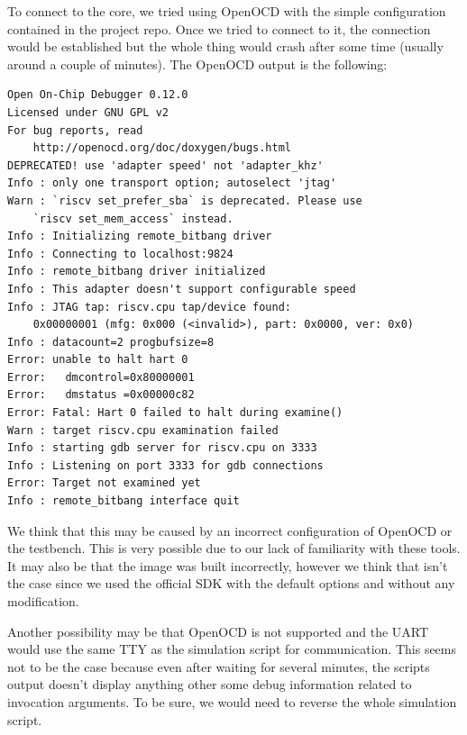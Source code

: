 \documentclass[a4paper,11pt]{article}
\begin{document}
To connect to the core, we tried using OpenOCD with the simple configuration
contained in the project repo. Once we tried to connect to it, the connection
would be established but the whole thing would crash after some time (usually
around a couple of minutes). The OpenOCD output is the following:

\begin{verbatim}
Open On-Chip Debugger 0.12.0
Licensed under GNU GPL v2
For bug reports, read
    http://openocd.org/doc/doxygen/bugs.html
DEPRECATED! use 'adapter speed' not 'adapter_khz'
Info : only one transport option; autoselect 'jtag'
Warn : `riscv set_prefer_sba` is deprecated. Please use
    `riscv set_mem_access` instead.
Info : Initializing remote_bitbang driver
Info : Connecting to localhost:9824
Info : remote_bitbang driver initialized
Info : This adapter doesn't support configurable speed
Info : JTAG tap: riscv.cpu tap/device found:
    0x00000001 (mfg: 0x000 (<invalid>), part: 0x0000, ver: 0x0)
Info : datacount=2 progbufsize=8
Error: unable to halt hart 0
Error:   dmcontrol=0x80000001
Error:   dmstatus =0x00000c82
Error: Fatal: Hart 0 failed to halt during examine()
Warn : target riscv.cpu examination failed
Info : starting gdb server for riscv.cpu on 3333
Info : Listening on port 3333 for gdb connections
Error: Target not examined yet
Info : remote_bitbang interface quit
\end{verbatim}

We think that this may be caused by an incorrect configuration of OpenOCD or the
testbench. This is very possible due to our lack of familiarity with these
tools. It may also be that the image was built incorrectly, however we think
that isn't the case since we used the official SDK with the default options and
without any modification.

Another possibility may be that OpenOCD is not supported and the UART would use
the same TTY as the simulation script for communication. This seems not to be
the case because even after waiting for several minutes, the scripts output
doesn't display anything other some debug information related to invocation
arguments. To be sure, we would need to reverse the whole simulation script.
\end{document}
